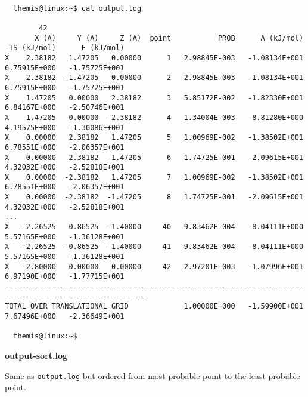 \documentclass{achemso}
\begin{document}
\begin{center}
  \begin{minipage}{0.95\textwidth}
    \vskip0.25cm
    \begin{verbatim}

  themis@linux:~$ cat output.log

        42
       X (A)     Y (A)     Z (A)  point           PROB      A (kJ/mol)    -TS (kJ/mol)      E (kJ/mol)
X    2.38182   1.47205   0.00000      1   2.98845E-003   -1.08134E+001    6.75915E+000   -1.75725E+001
X    2.38182  -1.47205   0.00000      2   2.98845E-003   -1.08134E+001    6.75915E+000   -1.75725E+001
X    1.47205   0.00000   2.38182      3   5.85172E-002   -1.82330E+001    6.84167E+000   -2.50746E+001
X    1.47205   0.00000  -2.38182      4   1.34004E-003   -8.81280E+000    4.19575E+000   -1.30086E+001
X    0.00000   2.38182   1.47205      5   1.00969E-002   -1.38502E+001    6.78551E+000   -2.06357E+001
X    0.00000   2.38182  -1.47205      6   1.74725E-001   -2.09615E+001    4.32032E+000   -2.52818E+001
X    0.00000  -2.38182   1.47205      7   1.00969E-002   -1.38502E+001    6.78551E+000   -2.06357E+001
X    0.00000  -2.38182  -1.47205      8   1.74725E-001   -2.09615E+001    4.32032E+000   -2.52818E+001
...
X   -2.26525   0.86525  -1.40000     40   9.83462E-004   -8.04111E+000    5.57165E+000   -1.36128E+001
X   -2.26525  -0.86525  -1.40000     41   9.83462E-004   -8.04111E+000    5.57165E+000   -1.36128E+001
X   -2.80000   0.00000   0.00000     42   2.97201E-003   -1.07996E+001    6.97190E+000   -1.77715E+001
-------------------------------------------------------------------------------------------------------
TOTAL OVER TRANSLATIONAL GRID             1.00000E+000   -1.59900E+001    7.67496E+000   -2.36649E+001

  themis@linux:~$ 

    \end{verbatim}
  \end{minipage}%
\end{center}

\textbf{output-sort.log}

  Same as \texttt{output.log} but ordered from most probable point to the least 
  probable point. \\~ 
\end{document}
